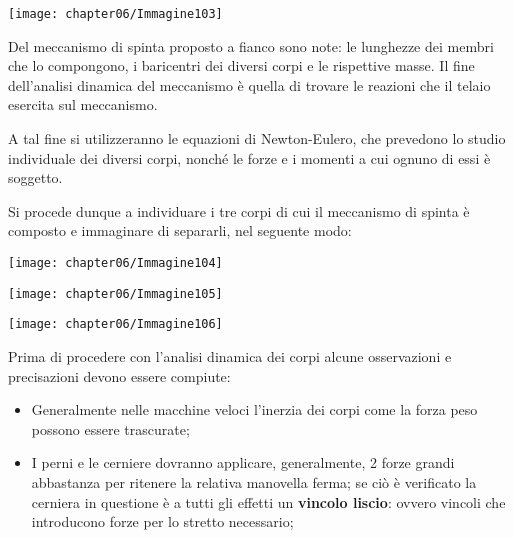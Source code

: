 		\begin{minipage}{.5\textwidth}
		\centering
		\texttt{[image: chapter06/Immagine103]}
		\end{minipage}
		\hfill
		\begin{minipage}{.5\textwidth}
		Del meccanismo di spinta proposto a fianco sono note: le lunghezze dei membri che lo compongono, i baricentri dei diversi corpi e le rispettive masse. Il fine dell'analisi dinamica del meccanismo è quella di trovare le reazioni che il telaio esercita sul meccanismo.
		
		A tal fine si utilizzeranno le equazioni di Newton-Eulero, che prevedono lo studio individuale dei diversi corpi, nonché le forze e i momenti a cui ognuno di essi è soggetto.
		\end{minipage}
		
		Si procede dunque a individuare i tre corpi di cui il meccanismo di spinta è composto e immaginare di separarli, nel seguente modo:
		\vspace{1mm}
		
		\begin{minipage}{.33\textwidth}
		\centering
		\texttt{[image: chapter06/Immagine104]}
		\end{minipage}
		\begin{minipage}{.33\textwidth}
		\centering
		\texttt{[image: chapter06/Immagine105]}
		\end{minipage}
		\hfill
		\begin{minipage}{.33\textwidth}
		\centering
		\texttt{[image: chapter06/Immagine106]}
\end{minipage}
\vspace{1mm}

Prima di procedere con l'analisi dinamica dei corpi alcune osservazioni e precisazioni devono essere compiute:
\begin{itemize}
\item Generalmente nelle macchine veloci l'inerzia dei corpi come la forza peso possono essere trascurate;
\item I perni e le cerniere dovranno applicare, generalmente, 2 forze grandi abbastanza per ritenere la relativa manovella ferma; se ciò è verificato la cerniera in questione è a tutti gli effetti un \textbf{vincolo liscio}: ovvero vincoli che introducono forze per lo stretto necessario;
\end{itemize}

